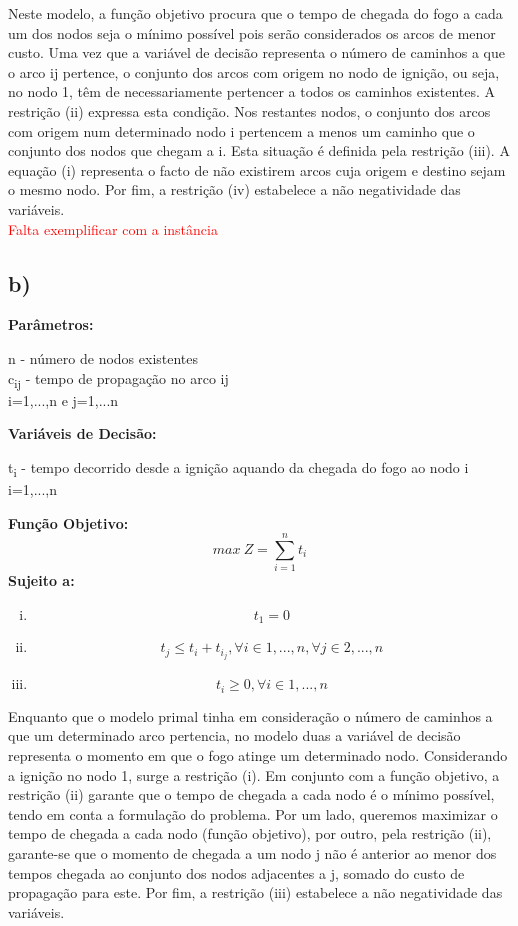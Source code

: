 \documentclass[11pt]{article} %
\begin{document}
Neste modelo, a função objetivo procura que o tempo de chegada do fogo a cada um dos nodos seja o mínimo possível pois serão considerados os arcos de menor custo. Uma vez que a variável de decisão representa o número de caminhos a que o arco ij pertence, o conjunto dos arcos com origem no nodo de ignição, ou seja, no nodo 1,  têm de necessariamente pertencer a todos os caminhos existentes. A restrição (ii) expressa esta condição. Nos restantes nodos, o conjunto dos arcos com origem num determinado nodo i pertencem a menos um caminho que o conjunto dos nodos que chegam a i. Esta situação é definida pela restrição (iii). A equação (i) representa o facto de não existirem arcos cuja origem e destino sejam o mesmo nodo. Por fim, a restrição (iv) estabelece a não negatividade das variáveis.\\
\textcolor{red}{Falta exemplificar com a instância}

\subsection*{b)}

\textbf{Parâmetros:}  \\
\begin{center}
n - número de nodos existentes \\
c\textsubscript{ij} - tempo de propagação no arco ij\\
i=1,...,n e j=1,...n \\
\end{center}
\textbf{Variáveis de Decisão:} \\
\begin{center}
t\textsubscript{i} - tempo decorrido desde a ignição aquando da chegada do fogo ao nodo i\\
i=1,...,n\\
\end{center}
\textbf{Função Objetivo:} \\
$$max \ Z = \sum_{i=1}^{n} t_i$$
\textbf{Sujeito a:}
\begin{enumerate}[(i)]
\item $$t_1 = 0$$
\item $$t_j \leq t_i + t_i_j, \forall i \in 1,...,n , \forall j \in 2,...,n$$
\item $$t_i \geq 0, \forall i \in 1,...,n$$
\end{enumerate}

Enquanto que o modelo primal tinha em consideração o número de caminhos a que um determinado arco pertencia, no modelo duas a variável de decisão representa o momento em que o fogo atinge um determinado nodo. Considerando a ignição no nodo 1, surge a restrição (i). Em conjunto com a função objetivo, a restrição (ii) garante que o tempo de chegada a cada nodo é o mínimo possível, tendo em conta a formulação do problema. Por um lado, queremos maximizar o tempo de chegada a cada nodo (função objetivo), por outro, pela restrição (ii), garante-se que o momento de chegada a um nodo j não é anterior ao menor dos tempos chegada ao conjunto dos nodos adjacentes a j, somado do custo de propagação para este. Por fim, a restrição (iii) estabelece a não negatividade das variáveis.
\end{document}

